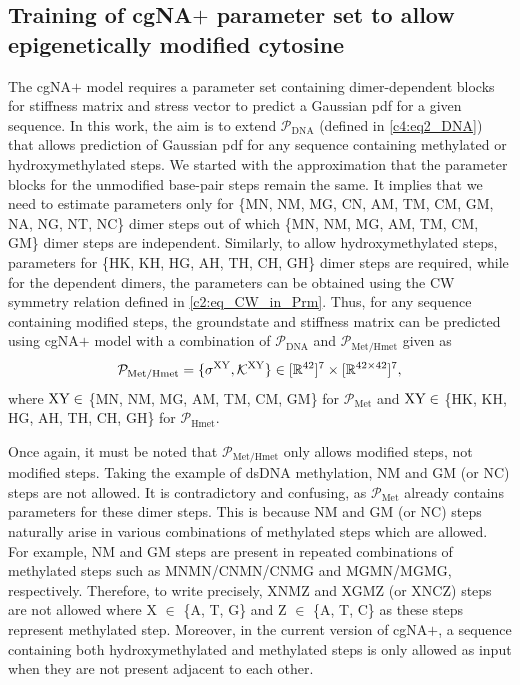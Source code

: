 \subsection{Training of cgNA$+$ parameter set to allow epigenetically modified cytosine}\label{c6:epi_param}
The cgNA$+$ model requires a parameter set containing dimer-dependent blocks for stiffness matrix and stress vector to predict a Gaussian pdf for a given sequence.
In this work, the aim is to extend $\mathcal{P}_{\text{DNA}}$ (defined in \cref{c4:eq2_DNA}) that allows prediction of Gaussian pdf for any sequence containing methylated or hydroxymethylated \cpg steps.
We started with the approximation that the parameter blocks for the unmodified base-pair steps remain the same.%
It implies that we need to estimate parameters only for \{MN, NM, MG, CN, AM, TM, CM, GM, NA, NG, NT, NC\} dimer steps out of which \{MN, NM, MG, AM, TM, CM, GM\} dimer steps are independent.
Similarly, to allow hydroxymethylated \cpg steps, parameters for \{HK, KH, HG, AH, TH, CH, GH\} dimer steps are required, while for the dependent dimers, the parameters can be obtained using the CW symmetry relation defined in \cref{c2:eq_CW_in_Prm}.
Thus, for any sequence containing modified \cpg steps, the groundstate and stiffness matrix can be predicted using cgNA$+$ model with a combination of $\mathcal{P}_{\text{DNA}}$ and $\mathcal{P}_{\text{Met/Hmet}}$ given as
\begin{equation}
\mathcal{P}_{\text{Met/Hmet}} = \{ \sigma^{{\text{XY}}}, {\mathcal K}^{{\text{XY}}} \} \in   [{\mathbb R}^{42}]^{7} \times [{\mathbb R}^{42 \times 42}]^{7},
\label{c6:eq1_prm_met}
\end{equation}
where ${\text{XY}} \in$ \{MN, NM, MG, AM, TM, CM, GM\} for $\mathcal{P}_{\text{Met}}$ and ${\text{XY}} \in$ \{HK, KH, HG, AH, TH, CH, GH\} for $\mathcal{P}_{\text{Hmet}}$. \vfill \clearpage

Once again, it must be noted that $\mathcal{P}_{\text{Met/Hmet}}$ only allows modified \cpg steps, not modified \gpc steps. 
Taking the example of dsDNA methylation, NM and GM (or NC) steps are not allowed.
It is contradictory and confusing, as $\mathcal{P}_{\text{Met}}$ already contains parameters for these dimer steps.
This is because NM and GM (or NC) steps naturally arise in various combinations of methylated \cpg steps which are allowed.
For example, NM and GM steps are present in repeated combinations of methylated \cpg steps such as MNMN/CNMN/CNMG and MGMN/MGMG, respectively.
Therefore, to write precisely, XNMZ and XGMZ (or XNCZ) steps are not allowed where X $\in$ \{A, T, G\} and Z $\in$ \{A, T, C\} as these steps represent methylated \gpc step.
Moreover, in the current version of cgNA$+$, a sequence containing both hydroxymethylated and methylated \cpg steps is only allowed as input when they are not present adjacent to each other.

